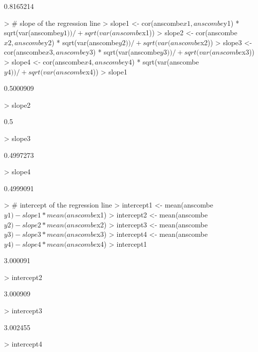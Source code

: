 \documentclass[12pt,letterpaper,final]{article}
\begin{document}
\begin{Schunk}
\begin{Soutput}
[1] 0.8165214
\end{Soutput}
\begin{Sinput}
> # slope of the regression line
> slope1 <- cor(anscombe$x1, anscombe$y1) * sqrt(var(anscombe$y1)) / 
+   sqrt(var(anscombe$x1))
> slope2 <- cor(anscombe$x2, anscombe$y2) * sqrt(var(anscombe$y2)) / 
+   sqrt(var(anscombe$x2))
> slope3 <- cor(anscombe$x3, anscombe$y3) * sqrt(var(anscombe$y3)) / 
+   sqrt(var(anscombe$x3))
> slope4 <- cor(anscombe$x4, anscombe$y4) * sqrt(var(anscombe$y4)) / 
+   sqrt(var(anscombe$x4))
> slope1
\end{Sinput}
\begin{Soutput}
[1] 0.5000909
\end{Soutput}
\begin{Sinput}
> slope2
\end{Sinput}
\begin{Soutput}
[1] 0.5
\end{Soutput}
\begin{Sinput}
> slope3
\end{Sinput}
\begin{Soutput}
[1] 0.4997273
\end{Soutput}
\begin{Sinput}
> slope4
\end{Sinput}
\begin{Soutput}
[1] 0.4999091
\end{Soutput}
\begin{Sinput}
> # intercept of the regression line
> intercept1 <- mean(anscombe$y1) - slope1 * mean(anscombe$x1)
> intercept2 <- mean(anscombe$y2) - slope2 * mean(anscombe$x2)
> intercept3 <- mean(anscombe$y3) - slope3 * mean(anscombe$x3)
> intercept4 <- mean(anscombe$y4) - slope4 * mean(anscombe$x4)
> intercept1
\end{Sinput}
\begin{Soutput}
[1] 3.000091
\end{Soutput}
\begin{Sinput}
> intercept2
\end{Sinput}
\begin{Soutput}
[1] 3.000909
\end{Soutput}
\begin{Sinput}
> intercept3
\end{Sinput}
\begin{Soutput}
[1] 3.002455
\end{Soutput}
\begin{Sinput}
> intercept4
\end{Sinput}
\begin{Soutput}

\end{Soutput}
\end{Schunk}
\end{document}
